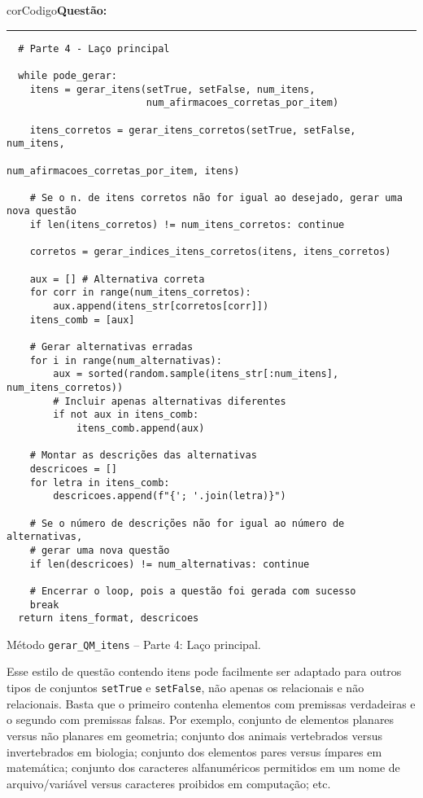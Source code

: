 \begin{listing}[!ht]
    \begin{myboxCode}{corCodigo}{\textbf{Questão: }}\vspace{3mm}
    \hrule
    \begin{verbatim}
  # Parte 4 - Laço principal

  while pode_gerar:
    itens = gerar_itens(setTrue, setFalse, num_itens, 
                        num_afirmacoes_corretas_por_item)

    itens_corretos = gerar_itens_corretos(setTrue, setFalse, num_itens,
                                          num_afirmacoes_corretas_por_item, itens)

    # Se o n. de itens corretos não for igual ao desejado, gerar uma nova questão
    if len(itens_corretos) != num_itens_corretos: continue

    corretos = gerar_indices_itens_corretos(itens, itens_corretos)

    aux = [] # Alternativa correta
    for corr in range(num_itens_corretos):
        aux.append(itens_str[corretos[corr]])
    itens_comb = [aux]

    # Gerar alternativas erradas
    for i in range(num_alternativas):
        aux = sorted(random.sample(itens_str[:num_itens], num_itens_corretos))
        # Incluir apenas alternativas diferentes
        if not aux in itens_comb:
            itens_comb.append(aux)

    # Montar as descrições das alternativas
    descricoes = []
    for letra in itens_comb:
        descricoes.append(f"{'; '.join(letra)}")

    # Se o número de descrições não for igual ao número de alternativas,
    # gerar uma nova questão
    if len(descricoes) != num_alternativas: continue

    # Encerrar o loop, pois a questão foi gerada com sucesso
    break
  return itens_format, descricoes
\end{verbatim}
\end{myboxCode}
\caption{Método \texttt{gerar\_QM\_itens} -- Parte 4: Laço principal.}
\label{lst:questaoQM_gerar_QM_itens_parte4}
\end{listing}


Esse estilo de questão contendo itens pode facilmente ser adaptado para outros tipos de conjuntos \verb|setTrue| e \verb|setFalse|, não apenas os relacionais e não relacionais. Basta que o primeiro contenha elementos com premissas verdadeiras e o segundo com premissas falsas. Por exemplo, conjunto de elementos planares versus não planares em geometria; conjunto dos animais vertebrados versus invertebrados em biologia; conjunto dos elementos pares versus ímpares em matemática; conjunto dos caracteres alfanuméricos permitidos em um nome de arquivo/variável versus caracteres proibidos em computação; etc.

